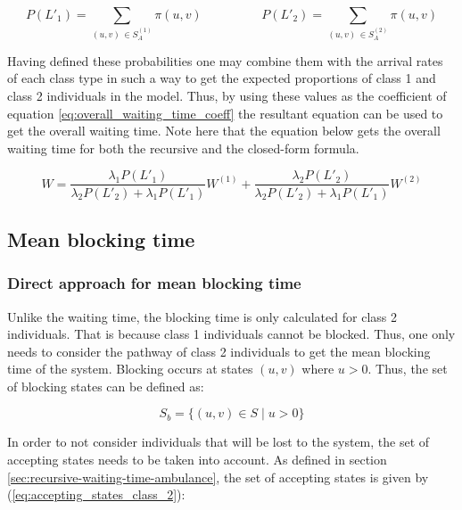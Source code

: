 \begin{equation*}
    P(L'_1) = \sum_{(u,v) \, \in S_A^{(1)}} \pi(u,v) \hspace{2cm}
    P(L'_2) = \sum_{(u,v) \, \in S_A^{(2)}} \pi(u,v)
\end{equation*}

Having defined these probabilities one may combine them with the arrival rates of 
each class type in such a way to get the expected proportions of class 1 and 
class 2 individuals in the model. 
Thus, by using these values as the coefficient of equation 
\ref{eq:overall_waiting_time_coeff} 
the resultant equation can be used to get the overall waiting time. 
Note here that the equation below gets the overall waiting time for both the recursive 
and the closed-form formula.

\begin{equation}\label{eq:overall_waiting_time}
    W = \frac{\lambda_1 P(L'_1)}{\lambda_2 P(L'_2) + \lambda_1 P(L'_1)} W^{(1)} + 
    \frac{\lambda_2 P(L'_2)}{\lambda_2 P(L'_2) + \lambda_1 P(L'_1)} W^{(2)}
\end{equation}



\subsection{Mean blocking time}

\subsubsection{Direct approach for mean blocking time}

Unlike the waiting time, the blocking time is only calculated for class 2 individuals.  
That is because class 1 individuals cannot be blocked. 
Thus, one only needs to consider the pathway of class 2 individuals to get the 
mean blocking time of the system. 
Blocking occurs at states \((u,v)\) where \(u > 0 \). 
Thus, the set of blocking states can be defined as:

\begin{equation*}
    S_b = \{(u,v) \in S \; | \; u > 0\}
\end{equation*}
 
In order to not consider individuals that will be lost to the system, the set of 
accepting states needs to be taken into account. As defined in section 
\ref{sec:recursive-waiting-time-ambulance},
the set of accepting states is given by (\ref{eq:accepting_states_class_2}):

